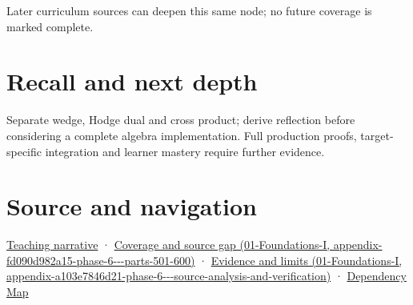 Later curriculum sources can deepen this same node; no future coverage is marked complete.

\section{Recall and next depth}\label{appendix-e1960925d1b8-recall-and-next-depth}

Separate wedge, Hodge dual and cross product; derive reflection before considering a complete algebra implementation. Full production proofs, target-specific integration and learner mastery require further evidence.

\section{Source and navigation}\label{appendix-e1960925d1b8-source-and-navigation}

\href{Continuous\%20Notes/Computing\%20Foundations\%20-\%20From\%20Bits\%20to\%20C++\%20and\%20Systems\%20APIs\#Oriented\%20areas\%20deserve\%20their\%20own\%20representation}{Teaching narrative} · \href{../01-Foundations-I/main.pdf\#nameddest=appendix-fd090d982a15-phase-6---parts-501-600}{Coverage and source gap (01-Foundations-I, appendix-fd090d982a15-phase-6-\/-\/-parts-501-600)} · \href{../01-Foundations-I/main.pdf\#nameddest=appendix-a103e7846d21-phase-6---source-analysis-and-verification}{Evidence and limits (01-Foundations-I, appendix-a103e7846d21-phase-6-\/-\/-source-analysis-and-verification)} · \hyperref[appendix-4ad47bdd269a]{Dependency Map}
